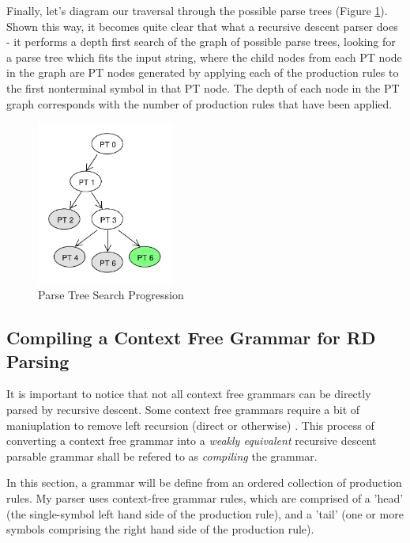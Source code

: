 \documentclass[11pt]{article}
\begin{document}
Finally, let's diagram our traversal through the possible parse trees (Figure \ref{fig:rdp_7}). Shown this way, it becomes quite
clear that what a recursive descent parser does - it performs a depth first search of the graph of possible parse trees, looking
for a parse tree which fits the input string, where the child nodes from each PT node in the graph are PT nodes generated by
applying each of the production rules to the first nonterminal symbol in that PT node. The depth of each node in the PT graph
corresponds with the number of production rules that have been applied.

\begin{figure}[h!]
    \centering
    \includegraphics[width=0.4\textwidth,natwidth=30,natheight=30]{rdp_7.pdf}
    \caption{Parse Tree Search Progression}
    \label{fig:rdp_7}
\end{figure}

\clearpage

\subsection{Compiling a Context Free Grammar for RD Parsing}

It is important to notice that not all context free grammars can be directly parsed by
recursive descent. Some context free grammars require a bit of maniuplation to remove
left recursion (direct or otherwise) \cite{compiler}. This process of converting a context
free grammar into a {\em weakly equivalent} recursive descent parsable grammar shall be refered to as
{\em compiling} the grammar.

In this section, a grammar will be define from an ordered collection of production rules.
My parser uses context-free grammar rules, which are comprised of a
'head' (the single-symbol left hand side of the production rule), and a 'tail'
(one or more symbols comprising the right hand side of the production rule).
\end{document}

